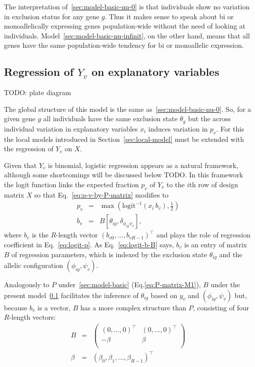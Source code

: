 \documentclass[letterpaper]{article}
\begin{document}
The interpretation of~\ref{sec:model-basic-nu-0} is that individuals show no
variation in exclusion status for any gene \(g\).  Thus it makes sense to
speak about bi or monoallelically expressing genes population-wide without the
need of looking at individuals.  Model~\ref{sec:model-basic-nu-infinit}, on the other hand,
means that all genes have the same population-wide tendency for bi or
monoallelic expression.

\subsection{Regression of \(Y_v\) on explanatory variables }
\label{sec:model-Y-regr}

TODO: plate diagram

The global structure of this model is the same as~\ref{sec:model-basic-nu-0}.  So, for a given gene \(g\) all individuals have the same
exclusion state \(\theta_g\) but the across individual variation in
explanatory variables \(x_i\) induces variation in \(p_v\).  For this the
local models introduced in Section~\ref{sec:local-model} must be extended with
the regression of \(Y_v\) on \(X\).

Given that \(Y_v\) is binomial, logistic regression appears as a natural
framework, although some shortcomings will be discussed below TODO.  In this
framework the logit function links the expected fraction \(p_v\) of \(Y_v\) to
the \(i\)th row of design matrix \(X\) so that Eq.~\ref{eq:p-v-by-P-matrix}
modifies to
\begin{eqnarray}
\label{eq:logit-p}
p_v &=& \max \left( \mathrm{logit}^{-1}(x_i\, b_v), \frac{1}{2} \right) \\
\label{eq:logit-b-B}
b_v &=& B[\theta_{ig},\delta_{\phi_{ig}\psi_v}],
\end{eqnarray}
where \(b_v\) is the
\(R\)-length vector \((b_{v0},...,b_{vR-1})^\top\) and plays the role of
regression coefficient in Eq.~\ref{eq:logit-p}. As Eq.~\ref{eq:logit-b-B}
says, \(b_v\) is an entry of matrix \(B\) of regression parameters,
which is indexed by the exclusion state \(\theta_{ig}\) and the allelic configuration
\((\phi_{ig},\psi_v)\).

Analogously to \(P\) under~\ref{sec:model-basic}
(Eq.\ref{eq:P-matrix-M1}), \(B\) under the present
model~\ref{sec:model-Y-regr} facilitates
the inference of \(\theta_{ig}\) based on \(y_v\) and \((\phi_{ig},\psi_v)\)
but, because \(b_v\) is a vector, \(B\) has a more complex structure than
\(P\), consisting of four \(R\)-length vectors:
\begin{eqnarray}
\label{eq:B-matrix-M2}
B &=&
\begin{pmatrix}
(0,...,0)^\top & (0,...,0)^\top \\
-\beta
&
\beta
\\
\end{pmatrix}
\\
\beta &=& (\beta_0,\beta_1,...,\beta_{R-1})^\top
\end{eqnarray}
\end{document}
